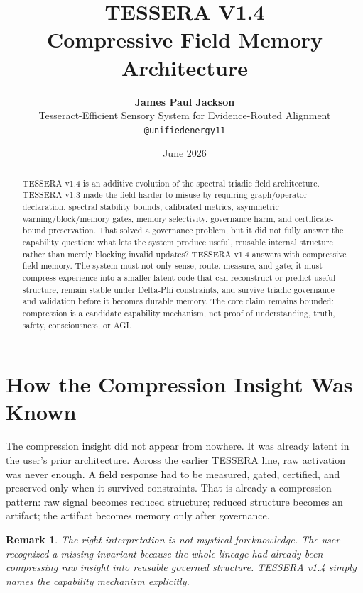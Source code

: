 \documentclass[12pt]{article}
\title{\textbf{TESSERA V1.4}\\
\large Compressive Field Memory Architecture}
\author{\textbf{James Paul Jackson}\\[4pt]
\small Tesseract-Efficient Sensory System for Evidence-Routed Alignment\\
\small \texttt{@unifiedenergy11}}
\date{June 2026}
\newtheorem{remark}{Remark}
\begin{document}
\maketitle

\begin{abstract}
TESSERA v1.4 is an additive evolution of the spectral triadic field architecture.
TESSERA v1.3 made the field harder to misuse by requiring graph/operator
declaration, spectral stability bounds, calibrated metrics, asymmetric
warning/block/memory gates, memory selectivity, governance harm, and
certificate-bound preservation. That solved a governance problem, but it did not
fully answer the capability question: what lets the system produce useful,
reusable internal structure rather than merely blocking invalid updates? TESSERA
v1.4 answers with compressive field memory. The system must not only sense,
route, measure, and gate; it must compress experience into a smaller latent code
that can reconstruct or predict useful structure, remain stable under
Delta-Phi constraints, and survive triadic governance and validation before it
becomes durable memory. The core claim remains bounded: compression is a
candidate capability mechanism, not proof of understanding, truth, safety,
consciousness, or AGI.
\end{abstract}

\section{How the Compression Insight Was Known}

The compression insight did not appear from nowhere. It was already latent in
the user's prior architecture. Across the earlier TESSERA line, raw activation
was never enough. A field response had to be measured, gated, certified, and
preserved only when it survived constraints. That is already a compression
pattern: raw signal becomes reduced structure; reduced structure becomes an
artifact; the artifact becomes memory only after governance.

\begin{remark}
The right interpretation is not mystical foreknowledge. The user recognized a
missing invariant because the whole lineage had already been compressing raw
insight into reusable governed structure. TESSERA v1.4 simply names the
capability mechanism explicitly.
\end{remark}
\end{document}
